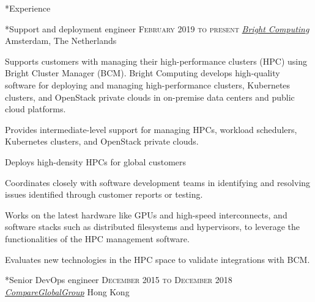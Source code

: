 \documentclass[10pt, a4paper, final]{article}
\begin{document}
\vspace{1em}

\begin{section}*{Experience}
  \begin{subsection}*{Support and deployment engineer \hfill\textsc{February 2019 to present}}
    \href{https://www.brightcomputing.com/}{\textit{Bright Computing}} \hfill Amsterdam, The Netherlands
    \vspace{1em}

    Supports customers with managing their high-performance clusters (HPC) using Bright Cluster Manager (BCM). Bright Computing develops high-quality software for deploying and managing high-performance clusters, Kubernetes clusters, and OpenStack private clouds in on-premise data centers and public cloud platforms.
    \vspace{1em}
    \begin{compactitem}
      \item Provides intermediate-level support for managing HPCs, workload schedulers, Kubernetes clusters, and OpenStack private clouds.
      \item Deploys high-density HPCs for global customers
      \item Coordinates closely with software development teams in identifying and resolving issues identified through customer reports or testing.
      \item Works on the latest hardware like GPUs and high-speed interconnects, and software stacks such as distributed filesystems and hypervisors, to leverage the functionalities of the HPC management software.
      \item Evaluates new technologies in the HPC space to validate integrations with BCM.
      
    \end{compactitem}
  \end{subsection}
  \vspace{2.5em}

  \begin{subsection}*{Senior DevOps engineer \hfill\textsc{December 2015 to December 2018}}
    \href{http://www.compareglobalgroup.com}{\textit{CompareGlobalGroup}} \hfill Hong Kong
    \vspace{1em}


\end{subsection}
\end{section}
\end{document}
